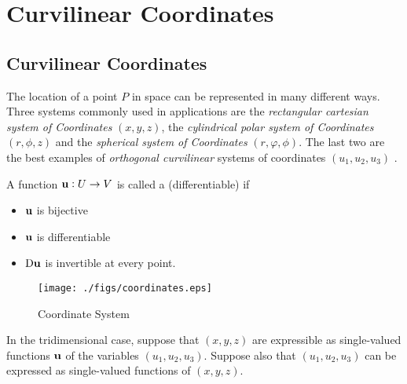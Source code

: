 \chapter{Curvilinear Coordinates} \label{sec:curvilinear2}
\label{chapter:curv}



\section{Curvilinear Coordinates}

The location of a point $P$ in space can be represented in many different 
 ways. Three systems commonly used in applications are the \emph{ rectangular
 cartesian system of Coordinates} $(x,y,z)$, the \emph{ cylindrical polar 
 system of Coordinates} $(r,\phi,z)$ and the 
 \emph{ spherical system of Coordinates} $(r,\varphi,\phi)$. 
 The last two are the best examples 
 of \emph{ orthogonal curvilinear} systems of coordinates 
 $(u_{1},u_{2},u_{3})$ . 



 

\begin{df}
    A function $\mathbf{ u}:U \to V$ is called a (differentiable)  if 
        \begin{itemize}
     \item  $\mathbf{ u}$ is bijective
     \item $\mathbf{ u}$ is differentiable 
     \item ${\mathrm{D}}\mathbf{ u}$ is invertible at every point.
    \end{itemize}
\end{df}

\begin{figure}[h]
 \centering
 \texttt{[image: ./figs/coordinates.eps]}
 \caption{Coordinate System}
 \label{fig:coord2}
\end{figure}








In the tridimensional case, suppose that $(x, y, z)$ are expressible as single-valued functions $\mathbf{ u}$ of the 
variables $(u_1, u_2, u_3)$. Suppose also that $(u_1, u_2, u_3)$ can be 
expressed as single-valued functions of $(x,y,z)$. 

